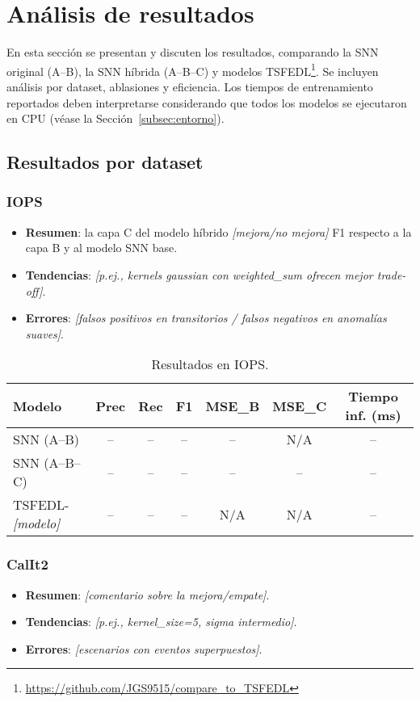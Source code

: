 \section{Análisis de resultados}

En esta sección se presentan y discuten los resultados, comparando la SNN original (A--B), la SNN híbrida (A--B--C) y modelos TSFEDL\footnote{\url{https://github.com/JGS9515/compare_to_TSFEDL}}. Se incluyen análisis por dataset, ablasiones y eficiencia.  Los tiempos de entrenamiento reportados deben interpretarse considerando que todos los modelos se ejecutaron en CPU (véase la Sección~\ref{subsec:entorno}).

\subsection{Resultados por dataset}

\subsubsection{IOPS}
\begin{itemize}
    \item \textbf{Resumen}: la capa C del modelo híbrido \textit{[mejora/no mejora]} F1 respecto a la capa B y al modelo SNN base.
    \item \textbf{Tendencias}: \textit{[p.ej., kernels gaussian con weighted\_sum ofrecen mejor trade-off]}.
    \item \textbf{Errores}: \textit{[falsos positivos en transitorios / falsos negativos en anomalías suaves]}.
\end{itemize}

\begin{table}[htbp]
\centering
\small
\begin{tabular}{lcccccc}
\hline\hline
\textbf{Modelo} & \textbf{Prec} & \textbf{Rec} & \textbf{F1} & \textbf{MSE\_B} & \textbf{MSE\_C} & \textbf{Tiempo inf. (ms)} \\
\hline
SNN (A--B) & -- & -- & -- & -- & N/A & -- \\
SNN (A--B--C) & -- & -- & -- & -- & -- & -- \\
TSFEDL-\textit{[modelo]} & -- & -- & -- & N/A & N/A & -- \\
\hline\hline
\end{tabular}
\caption{Resultados en IOPS.}
\label{tab:resultados-iops}
\end{table}

\subsubsection{CalIt2}
\begin{itemize}
    \item \textbf{Resumen}: \textit{[comentario sobre la mejora/empate]}.
    \item \textbf{Tendencias}: \textit{[p.ej., kernel\_size=5, sigma intermedio]}.
    \item \textbf{Errores}: \textit{[escenarios con eventos superpuestos]}.
\end{itemize}

